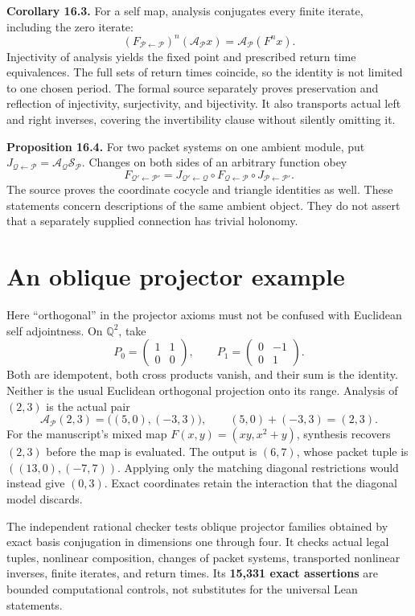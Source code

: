 \documentclass[11pt]{article}
\newcommand{\A}{\mathcal A}\newcommand{\Synthesis}{\mathcal S}
\newcommand{\Pcal}{\mathcal P}\newcommand{\Qcal}{\mathcal Q}\newcommand{\Rcal}{\mathcal R}
\begin{document}
\textbf{Corollary 16.3.} For a self map, analysis conjugates every finite iterate, including the zero iterate:
\[
 (F_{\Pcal\leftarrow\Pcal})^n(\A_{\Pcal}x)
 =\A_{\Pcal}(F^nx).
\]
Injectivity of analysis yields the fixed point and prescribed return time equivalences. The full sets of return times coincide, so the identity is not limited to one chosen period. The formal source separately proves preservation and reflection of injectivity, surjectivity, and bijectivity. It also transports actual left and right inverses, covering the invertibility clause without silently omitting it.

\textbf{Proposition 16.4.} For two packet systems on one ambient module, put $J_{\Qcal\leftarrow\Pcal}=\A_{\Qcal}\Synthesis_{\Pcal}$. Changes on both sides of an arbitrary function obey
\[
 F_{\Qcal'\leftarrow\Pcal'}
 =J_{\Qcal'\leftarrow\Qcal}\circ F_{\Qcal\leftarrow\Pcal}
   \circ J_{\Pcal\leftarrow\Pcal'}.
\]
The source proves the coordinate cocycle and triangle identities as well. These statements concern descriptions of the same ambient object. They do not assert that a separately supplied connection has trivial holonomy.

\section{An oblique projector example}
Here ``orthogonal'' in the projector axioms must not be confused with Euclidean self adjointness. On $\mathbb Q^2$, take
\[
 P_0=\begin{pmatrix}1&1\\0&0\end{pmatrix},\qquad
 P_1=\begin{pmatrix}0&-1\\0&1\end{pmatrix}.
\]
Both are idempotent, both cross products vanish, and their sum is the identity. Neither is the usual Euclidean orthogonal projection onto its range. Analysis of $(2,3)$ is the actual pair
\[
 \A_{\Pcal}(2,3)=\bigl((5,0),(-3,3)\bigr),
 \qquad (5,0)+(-3,3)=(2,3).
\]
For the manuscript's mixed map $F(x,y)=(xy,x^2+y)$, synthesis recovers $(2,3)$ before the map is evaluated. The output is $(6,7)$, whose packet tuple is $((13,0),(-7,7))$. Applying only the matching diagonal restrictions would instead give $(0,3)$. Exact coordinates retain the interaction that the diagonal model discards.

The independent rational checker tests oblique projector families obtained by exact basis conjugation in dimensions one through four. It checks actual legal tuples, nonlinear composition, changes of packet systems, transported nonlinear inverses, finite iterates, and return times. Its \textbf{15,331 exact assertions} are bounded computational controls, not substitutes for the universal Lean statements.
\end{document}
